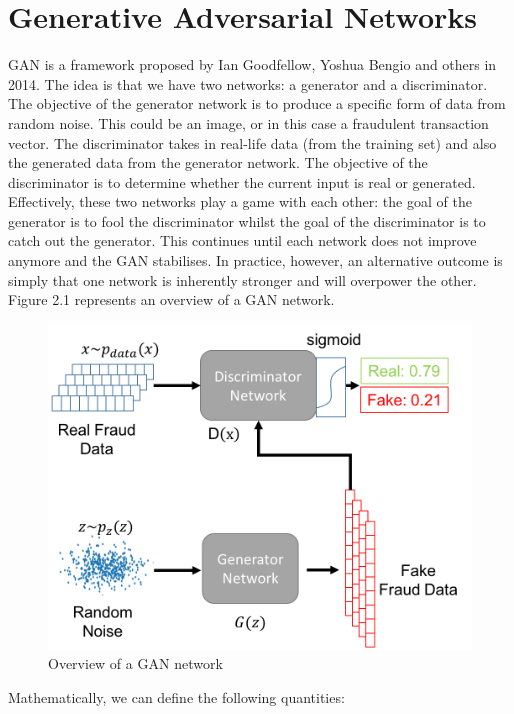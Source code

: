 \documentclass[12pt,a4paper,twoside]{report}
\begin{document}
\section{Generative Adversarial Networks}
GAN is a framework proposed by Ian Goodfellow, Yoshua Bengio and others in 2014\cite{2014arXiv1406.2661G}. The idea is that we have two networks: a generator and a discriminator. The objective of the generator network is to produce a specific form of data from random noise. This could be an image, or in this case a fraudulent transaction vector. The discriminator takes in real-life data (from the training set) and also the generated data from the generator network. The objective of the discriminator is to determine whether the current input is real or generated. Effectively, these two networks play a game with each other: the goal of the generator is to fool the discriminator whilst the goal of the discriminator is to catch out the generator. This continues until each network does not improve anymore and the GAN stabilises. In practice, however, an alternative outcome is simply that one network is inherently stronger and will overpower the other. Figure 2.1 represents an overview of a GAN network.

\begin{figure}[!htbp]

\centering
\includegraphics[width=\textwidth]{GAN-Overview-withequations}
\caption{Overview of a GAN network}
\end{figure}

Mathematically, we can define the following quantities:
\end{document}
